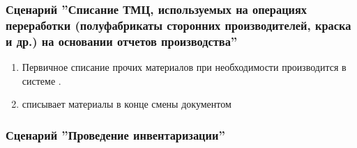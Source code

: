 





\subsubsection{Сценарий ''Списание ТМЦ, используемых на операциях переработки (полуфабрикаты сторонних производителей, краска и др.) на основании отчетов производства''}
\label{bp:storage_10}


\begin{enumerate}
\item Первичное списание прочих материалов при необходимости производится в системе \gofro. 
\item \kladovshik списывает материалы в конце смены документом   
\end{enumerate}


\subsubsection{Сценарий ''Проведение инвентаризации''}
\label{bp:storage_11}


